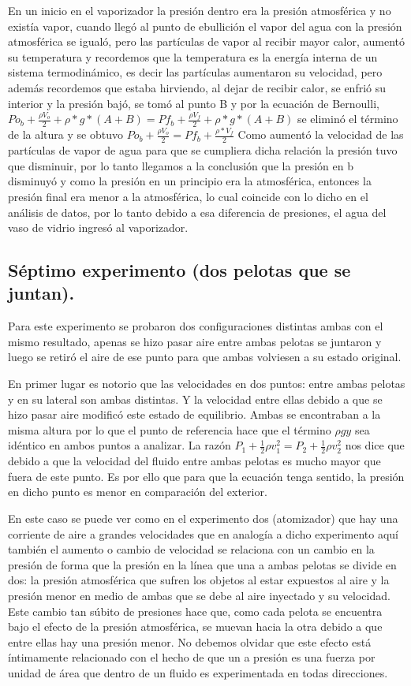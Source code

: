 \documentclass[10pt,a4paper]{article}
\begin{document}
En un inicio en el vaporizador la presión dentro era la presión atmosférica y no existía vapor, cuando llegó al punto de ebullición el vapor del agua con la presión atmosférica se igualó, pero las partículas de vapor al recibir mayor calor, aumentó su temperatura y recordemos que la temperatura es la energía interna de un sistema termodinámico, es decir las partículas aumentaron su velocidad, pero además recordemos que estaba hirviendo, al dejar de recibir calor, se enfrió su interior y la  presión bajó, se tomó al punto B y por la ecuación de Bernoulli, $Po_b+ \frac{\rho V_o}{2}+ \rho* g*(A+B)=Pf_b+ \frac{\rho V_f}{2}+ \rho* g*(A+B)$ se eliminó el término de la altura y se obtuvo $Po_b+ \frac{\rho V_o}{2}=Pf_b+ \frac{\rho*V_f}{2}$ Como aumentó la velocidad de las partículas de vapor de agua para que se cumpliera dicha relación la presión tuvo que disminuir, por lo tanto llegamos a la conclusión que la presión en b disminuyó y como la presión en un principio era la atmosférica, entonces la presión final era menor a la atmosférica, lo cual coincide con lo dicho en el análisis de datos, por lo tanto debido a esa diferencia de presiones, el agua del vaso de vidrio ingresó al vaporizador.

\subsection*{Séptimo experimento (dos pelotas que se juntan).}

Para este experimento se probaron dos configuraciones distintas ambas con el mismo resultado, apenas se hizo pasar aire entre ambas pelotas se juntaron y luego se retiró el aire de ese punto para que ambas volviesen a su estado original. 

En primer lugar es notorio que las velocidades en dos puntos: entre ambas pelotas y en su lateral son ambas distintas. Y la velocidad entre ellas debido a que se hizo pasar aire modificó este estado de equilibrio. Ambas se encontraban a la misma altura por lo que el punto de referencia hace que el término $\rho g y $ sea idéntico en ambos puntos a analizar. La razón $P_1 + \frac{1}{2} \rho v_1^2 = P_2 + \frac{1}{2} \rho v_2^2$ nos dice que debido a que la velocidad del fluido entre ambas pelotas es mucho mayor que fuera de este punto. Es por ello que para que la ecuación tenga sentido, la presión en dicho punto es menor en comparación del exterior.

En este caso se puede ver como en el experimento dos (atomizador) que hay una corriente de aire a grandes velocidades que en analogía a dicho experimento aquí también el aumento o cambio de velocidad se relaciona con un cambio en la presión de forma que la presión en la línea que una a ambas pelotas se divide en dos: la presión atmosférica que sufren los objetos al estar expuestos al aire y la presión menor en medio de ambas que se debe al aire inyectado y su velocidad. Este cambio tan súbito de presiones hace que, como cada pelota se encuentra bajo el efecto de la presión atmosférica, se muevan hacia la otra debido a que entre ellas hay una presión menor. No debemos olvidar que este efecto está íntimamente relacionado con el hecho de que  un a presión es una fuerza por unidad de área que dentro de un fluido es experimentada en todas direcciones.
\end{document}
